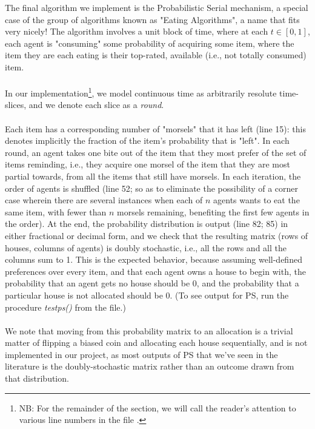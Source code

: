 \documentclass[12pt]{article}
\begin{document}

The final algorithm we implement is the Probabilistic Serial mechanism, a special case of the group of algorithms known as "Eating Algorithms", a name that fits very nicely! The algorithm involves a unit block of time, where at each $t \in [0, 1]$, each agent is "consuming" some probability of acquiring some item, where the item they are each eating is their top-rated, available (i.e., not totally consumed) item.\\\\In our implementation\footnote{NB: For the remainder of the section, we will call the reader's attention to various line numbers in the file .}, we model continuous time as arbitrarily resolute time-slices, and we denote each slice as a \emph{round}.
\\\\Each item has a corresponding number of "morsels" that it has left (line 15): this denotes implicitly the fraction of the item's probability that is "left". In each round, an agent takes one bite out of the item that they most prefer of the set of items reminding, i.e., they acquire one morsel of the item that they are most partial towards, from all the items that still have morsels. In each iteration, the order of agents is shuffled (line 52; so as to eliminate the possibility of a corner case wherein there are several instances when each of $n$ agents wants to eat the same item, with fewer than $n$ morsels remaining, benefiting the first few agents in the order). At the end, the probability distribution is output (line 82; 85) in either fractional or decimal form, and we check that the resulting matrix (rows of houses, columns of agents) is doubly stochastic, i.e., all the rows and all the columns sum to 1. This is the expected behavior, because assuming well-defined preferences over every item, and that each agent owns a house to begin with, the probability that an agent gets no house should be 0, and the probability that a particular house is not allocated should be 0. (To see output for PS, run the procedure \emph{test\textunderscore ps()} from the file.)\\\\We note that moving from this probability matrix to an allocation is a trivial matter of flipping a biased coin and allocating each house sequentially, and is not implemented in our project, as most outputs of PS that we've seen in the literature is the doubly-stochastic matrix rather than an outcome drawn from that distribution.
\end{document}
